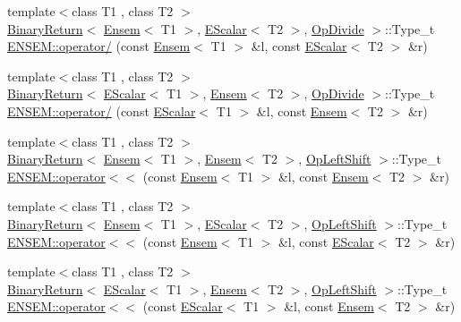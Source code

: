 \begin{DoxyCompactItemize}
{\footnotesize template$<$class T1 , class T2 $>$ }\\\mbox{\hyperlink{structENSEM_1_1BinaryReturn}{Binary\+Return}}$<$ \mbox{\hyperlink{classENSEM_1_1Ensem}{Ensem}}$<$ T1 $>$, \mbox{\hyperlink{classENSEM_1_1EScalar}{E\+Scalar}}$<$ T2 $>$, \mbox{\hyperlink{structENSEM_1_1OpDivide}{Op\+Divide}} $>$\+::Type\+\_\+t \mbox{\hyperlink{group__eensem_ga77b1f275ee5f8d89819ec03dab4ff756}{E\+N\+S\+E\+M\+::operator/}} (const \mbox{\hyperlink{classENSEM_1_1Ensem}{Ensem}}$<$ T1 $>$ \&l, const \mbox{\hyperlink{classENSEM_1_1EScalar}{E\+Scalar}}$<$ T2 $>$ \&r)
\item 
{\footnotesize template$<$class T1 , class T2 $>$ }\\\mbox{\hyperlink{structENSEM_1_1BinaryReturn}{Binary\+Return}}$<$ \mbox{\hyperlink{classENSEM_1_1EScalar}{E\+Scalar}}$<$ T1 $>$, \mbox{\hyperlink{classENSEM_1_1Ensem}{Ensem}}$<$ T2 $>$, \mbox{\hyperlink{structENSEM_1_1OpDivide}{Op\+Divide}} $>$\+::Type\+\_\+t \mbox{\hyperlink{group__eensem_ga6a5de93e7f9569ae6390f831343a0430}{E\+N\+S\+E\+M\+::operator/}} (const \mbox{\hyperlink{classENSEM_1_1EScalar}{E\+Scalar}}$<$ T1 $>$ \&l, const \mbox{\hyperlink{classENSEM_1_1Ensem}{Ensem}}$<$ T2 $>$ \&r)
\item 
{\footnotesize template$<$class T1 , class T2 $>$ }\\\mbox{\hyperlink{structENSEM_1_1BinaryReturn}{Binary\+Return}}$<$ \mbox{\hyperlink{classENSEM_1_1Ensem}{Ensem}}$<$ T1 $>$, \mbox{\hyperlink{classENSEM_1_1Ensem}{Ensem}}$<$ T2 $>$, \mbox{\hyperlink{structENSEM_1_1OpLeftShift}{Op\+Left\+Shift}} $>$\+::Type\+\_\+t \mbox{\hyperlink{group__eensem_ga822a79ca0b7e9ffdd3c9fbfaad909967}{E\+N\+S\+E\+M\+::operator$<$$<$}} (const \mbox{\hyperlink{classENSEM_1_1Ensem}{Ensem}}$<$ T1 $>$ \&l, const \mbox{\hyperlink{classENSEM_1_1Ensem}{Ensem}}$<$ T2 $>$ \&r)
\item 
{\footnotesize template$<$class T1 , class T2 $>$ }\\\mbox{\hyperlink{structENSEM_1_1BinaryReturn}{Binary\+Return}}$<$ \mbox{\hyperlink{classENSEM_1_1Ensem}{Ensem}}$<$ T1 $>$, \mbox{\hyperlink{classENSEM_1_1EScalar}{E\+Scalar}}$<$ T2 $>$, \mbox{\hyperlink{structENSEM_1_1OpLeftShift}{Op\+Left\+Shift}} $>$\+::Type\+\_\+t \mbox{\hyperlink{group__eensem_ga6651d0e3a61fd80d621e17a1ae4496af}{E\+N\+S\+E\+M\+::operator$<$$<$}} (const \mbox{\hyperlink{classENSEM_1_1Ensem}{Ensem}}$<$ T1 $>$ \&l, const \mbox{\hyperlink{classENSEM_1_1EScalar}{E\+Scalar}}$<$ T2 $>$ \&r)
\item 
{\footnotesize template$<$class T1 , class T2 $>$ }\\\mbox{\hyperlink{structENSEM_1_1BinaryReturn}{Binary\+Return}}$<$ \mbox{\hyperlink{classENSEM_1_1EScalar}{E\+Scalar}}$<$ T1 $>$, \mbox{\hyperlink{classENSEM_1_1Ensem}{Ensem}}$<$ T2 $>$, \mbox{\hyperlink{structENSEM_1_1OpLeftShift}{Op\+Left\+Shift}} $>$\+::Type\+\_\+t \mbox{\hyperlink{group__eensem_ga8276aea8565989d936393895688a0a95}{E\+N\+S\+E\+M\+::operator$<$$<$}} (const \mbox{\hyperlink{classENSEM_1_1EScalar}{E\+Scalar}}$<$ T1 $>$ \&l, const \mbox{\hyperlink{classENSEM_1_1Ensem}{Ensem}}$<$ T2 $>$ \&r)

\end{DoxyCompactItemize}
